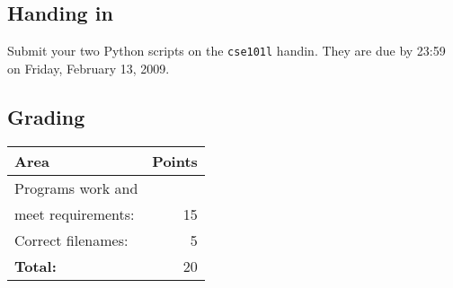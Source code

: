 \documentclass[11pt, letterpaper]{article}
\begin{document}
\subsection*{Handing in}

Submit your two Python scripts on the {\tt cse101l} handin. They are due by 23:59 on Friday, February 13, 2009.

\subsection*{Grading}

\begin{tabular}{lr}
	Area & Points\\
	\hline
	Programs work and & ~\\
	meet requirements: & 15\\
	Correct filenames: & 5\\
	{\bf Total:} & 20
\end{tabular}
\end{document}
